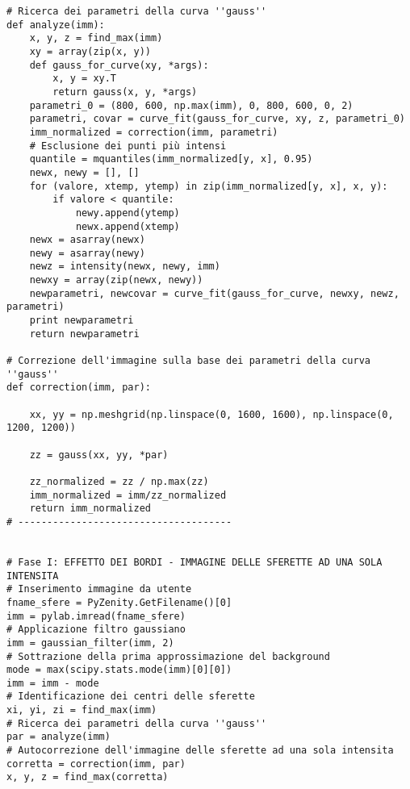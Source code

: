 \begin{lstlisting}
# Ricerca dei parametri della curva ''gauss''
def analyze(imm):
    x, y, z = find_max(imm)
    xy = array(zip(x, y))
    def gauss_for_curve(xy, *args):
        x, y = xy.T
        return gauss(x, y, *args)
    parametri_0 = (800, 600, np.max(imm), 0, 800, 600, 0, 2)
    parametri, covar = curve_fit(gauss_for_curve, xy, z, parametri_0)
    imm_normalized = correction(imm, parametri)
    # Esclusione dei punti più intensi
    quantile = mquantiles(imm_normalized[y, x], 0.95)
    newx, newy = [], []
    for (valore, xtemp, ytemp) in zip(imm_normalized[y, x], x, y):
        if valore < quantile:
            newy.append(ytemp) 
            newx.append(xtemp)
    newx = asarray(newx) 
    newy = asarray(newy)
    newz = intensity(newx, newy, imm)
    newxy = array(zip(newx, newy))
    newparametri, newcovar = curve_fit(gauss_for_curve, newxy, newz, parametri)
    print newparametri
    return newparametri

# Correzione dell'immagine sulla base dei parametri della curva ''gauss''
def correction(imm, par):

    xx, yy = np.meshgrid(np.linspace(0, 1600, 1600), np.linspace(0, 1200, 1200))
    
    zz = gauss(xx, yy, *par)
    
    zz_normalized = zz / np.max(zz)
    imm_normalized = imm/zz_normalized
    return imm_normalized 
# -------------------------------------


# Fase I: EFFETTO DEI BORDI - IMMAGINE DELLE SFERETTE AD UNA SOLA INTENSITA
# Inserimento immagine da utente
fname_sfere = PyZenity.GetFilename()[0]
imm = pylab.imread(fname_sfere)
# Applicazione filtro gaussiano
imm = gaussian_filter(imm, 2)
# Sottrazione della prima approssimazione del background
mode = max(scipy.stats.mode(imm)[0][0])
imm = imm - mode
# Identificazione dei centri delle sferette
xi, yi, zi = find_max(imm)
# Ricerca dei parametri della curva ''gauss''
par = analyze(imm)
# Autocorrezione dell'immagine delle sferette ad una sola intensita
corretta = correction(imm, par)
x, y, z = find_max(corretta)



\end{lstlisting}

